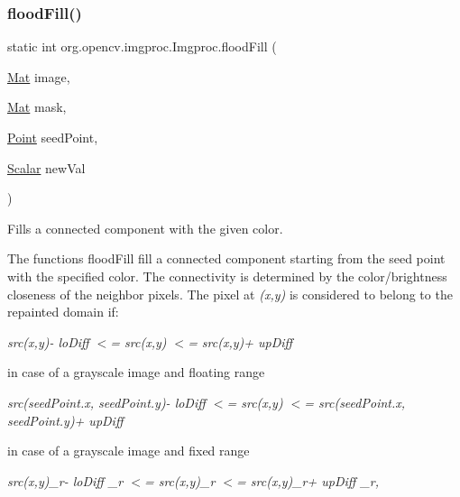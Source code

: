 \subsubsection{\texorpdfstring{flood\+Fill()}{floodFill()}\hspace{0.1cm}{\footnotesize\ttfamily [2/2]}}
{\footnotesize\ttfamily static int org.\+opencv.\+imgproc.\+Imgproc.\+flood\+Fill (\begin{DoxyParamCaption}\item[{\mbox{\hyperlink{classorg_1_1opencv_1_1core_1_1_mat}{Mat}}}]{image,  }\item[{\mbox{\hyperlink{classorg_1_1opencv_1_1core_1_1_mat}{Mat}}}]{mask,  }\item[{\mbox{\hyperlink{classorg_1_1opencv_1_1core_1_1_point}{Point}}}]{seed\+Point,  }\item[{\mbox{\hyperlink{classorg_1_1opencv_1_1core_1_1_scalar}{Scalar}}}]{new\+Val }\end{DoxyParamCaption})\hspace{0.3cm}{\ttfamily [static]}}

Fills a connected component with the given color.

The functions {\ttfamily flood\+Fill} fill a connected component starting from the seed point with the specified color. The connectivity is determined by the color/brightness closeness of the neighbor pixels. The pixel at {\itshape (x,y)} is considered to belong to the repainted domain if\+:


\begin{DoxyItemize}
\item {\itshape src(x\textquotesingle{},y\textquotesingle{})-\/ lo\+Diff $<$= src(x,y) $<$= src(x\textquotesingle{},y\textquotesingle{})+ up\+Diff} 
\end{DoxyItemize}

in case of a grayscale image and floating range


\begin{DoxyItemize}
\item {\itshape src(seed\+Point.\+x, seed\+Point.\+y)-\/ lo\+Diff $<$= src(x,y) $<$= src(seed\+Point.\+x, seed\+Point.\+y)+ up\+Diff} 
\end{DoxyItemize}

in case of a grayscale image and fixed range


\begin{DoxyItemize}
\item {\itshape src(x\textquotesingle{},y\textquotesingle{})\+\_\+r-\/ lo\+Diff \+\_\+r $<$= src(x,y)\+\_\+r $<$= src(x\textquotesingle{},y\textquotesingle{})\+\_\+r+ up\+Diff \+\_\+r,}


\end{DoxyItemize}

